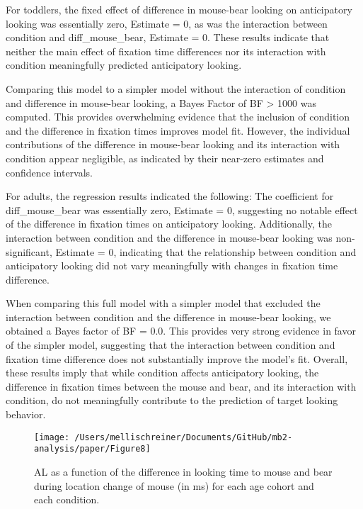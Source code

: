 \documentclass[
  man, donotrepeattitle,floatsintext]{apa6}
\begin{document}
For toddlers, the fixed effect of difference in mouse-bear looking on anticipatory looking was essentially zero, Estimate = 0, as was the interaction between condition and diff\_mouse\_bear, Estimate = 0. These results indicate that neither the main effect of fixation time differences nor its interaction with condition meaningfully predicted anticipatory looking.

Comparing this model to a simpler model without the interaction of condition and difference in mouse-bear looking, a Bayes Factor of BF \textgreater{} 1000 was computed. This provides overwhelming evidence that the inclusion of condition and the difference in fixation times improves model fit. However, the individual contributions of the difference in mouse-bear looking and its interaction with condition appear negligible, as indicated by their near-zero estimates and confidence intervals.

For adults, the regression results indicated the following:
The coefficient for diff\_mouse\_bear was essentially zero, Estimate = 0, suggesting no notable effect of the difference in fixation times on anticipatory looking. Additionally, the interaction between condition and the difference in mouse-bear looking was non-significant, Estimate = 0, indicating that the relationship between condition and anticipatory looking did not vary meaningfully with changes in fixation time difference.

When comparing this full model with a simpler model that excluded the interaction between condition and the difference in mouse-bear looking, we obtained a Bayes factor of BF = 0.0. This provides very strong evidence in favor of the simpler model, suggesting that the interaction between condition and fixation time difference does not substantially improve the model's fit. Overall, these results imply that while condition affects anticipatory looking, the difference in fixation times between the mouse and bear, and its interaction with condition, do not meaningfully contribute to the prediction of target looking behavior.

\begin{figure}

{\centering \texttt{[image: /Users/mellischreiner/Documents/GitHub/mb2-analysis/paper/Figure8]} 

}

\caption{AL as a function of the difference in looking time to mouse and bear during location change of mouse (in ms) for each age cohort and each condition.}\label{fig:fig10}
\end{figure}
\end{document}

